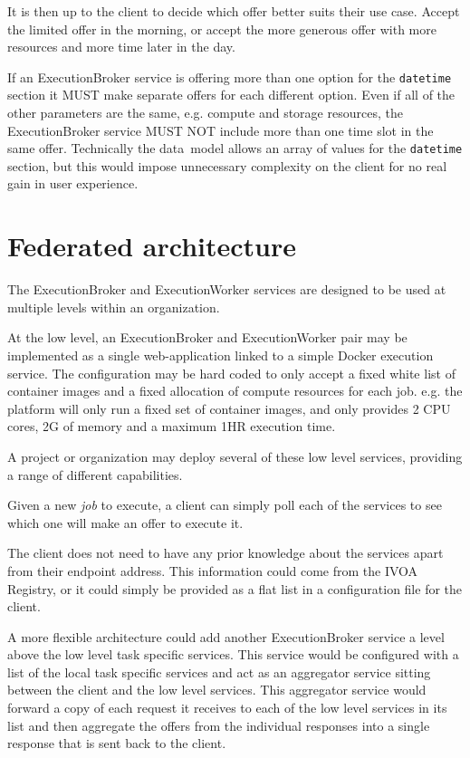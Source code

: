 \documentclass[11pt,a4paper]{ivoa}
\newcommand{\datamodel} {data~model}
\newcommand{\ivoa} {IVOA}
\newcommand{\execbrokerclass} {ExecutionBroker}
\newcommand{\execworkerclass} {ExecutionWorker}
\newcommand{\docker} {Docker}
\newcommand{\codeword}[1] {\texttt{#1}}
\newcommand{\cpu}[1] {CPU#1}
\newcommand{\job} {\textit{job}}
\begin{document}
It is then up to the client to decide which offer better suits their use case.
Accept the limited offer in the morning, or accept the more generous offer with
more resources and more time later in the day.

If an \execbrokerclass{} service is offering more than one option for the \codeword{datetime}
section it MUST make separate offers for each different option.
Even if all of the other parameters are the same, e.g. compute and storage resources, the
\execbrokerclass{} service MUST NOT include more than one time slot in the same offer.
Technically the \datamodel{} allows an array of values for the \codeword{datetime} section,
but this would impose unnecessary complexity on the client for no real gain in user experience.


\pagebreak

\section{Federated architecture}
\label{federation}

The \execbrokerclass{} and \execworkerclass{} services are designed to be used at multiple levels within an organization.

At the low level, an \execbrokerclass{} and \execworkerclass{} pair may be implemented as a
single web-application linked to a simple \docker{} execution service.
The configuration may be hard coded to only accept a fixed white list of container images
and a fixed allocation of compute resources for each job{}.
e.g. the platform will only run a fixed set of container images, and only provides 2 \cpu{} cores, 2G of memory and a maximum 1HR execution time.

A project or organization may deploy several of these low level services,
providing a range of different capabilities.

Given a new \job{} to execute, a client can simply poll each of the services to see which one will
make an offer to execute it.

The client does not need to have any prior knowledge about the services apart from their
endpoint address.
This information could come from the \ivoa{} Registry, or it could simply
be provided as a flat list in a configuration file for the client.

A more flexible architecture could add another \execbrokerclass{} service
a level above the low level task specific services.
This service would be configured with a list of the local task specific services
and act as an aggregator service sitting between the client and the low level services.
This aggregator service would forward a copy of each request it receives to each of the low level services in its list and
then aggregate the offers from the individual responses into a single response that is sent back to the client.
\end{document}
